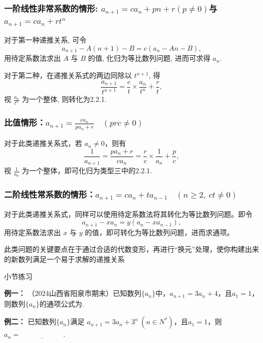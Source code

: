 \documentclass{article}
\begin{document}
\subsubsection{一阶线性非常系数的情形: $a_{n+1}=ca_n+pn+r(p\neq 0)$与$a_{n+1}=ca_n+rt^n$}

对于第一种递推关系, 可令
\[
a_{n+1} - A(n+1) - B = c(a_n - An - B),
\]
用待定系数法求出 \(A\) 与 \(B\) 的值, 化归为等比数列问题, 进而可求得 \(a_n\).


对于第二种，在递推关系式的两边同除以 \(t^{n+1}\), 得
\[
\frac{a_{n+1}}{t^{n+1}} = \frac{c}{t} \times \frac{a_n}{t^n} + \frac{r}{t},
\]
视 \(\frac{a_n}{t^n}\) 为一个整体, 则转化为2.2.1.

\subsubsection{比值情形：$a_{n+1} = \frac{ca_n}{pa_n + r} \quad (prc \neq 0)$}

对于此类递推关系式，若 \(a_n \neq 0\)，则有
\[
\frac{1}{a_{n+1}} = \frac{pa_n + r}{ca_n} = \frac{r}{c} \times \frac{1}{a_n} + \frac{p}{c},
\]
视 \(\frac{1}{a_n}\) 为一个整体，即可化归为类型三中的2.2.1.

\subsubsection{二阶线性常系数的情形：$a_{n+1} = ca_n + ta_{n-1} \quad (n \ge 2,\ ct \neq 0)$}

对于此类递推关系式，同样可以使用待定系数法将其转化为等比数列问题。即令
\[
a_{n+1} - xa_n = y(a_n - xa_{n-1}),
\]
用待定系数法求出 \(x\) 与 \(y\) 的值，即可转化为等比数列问题，进而求通项。

\newpage

\begin{tcolorbox}[colback=blue!10,colframe=blue!70!black,title=]
    此类问题的关键要点在于通过合适的代数变形，再进行“换元”处理，使你构建出来的新数列满足一个易于求解的递推关系
\end{tcolorbox}

\begin{center}
    小节练习
\end{center}

\noindent \textbf{例一： }（2024山西省阳泉市期末）已知数列$\{a_n\}$中，$a_{n+1}=3a_n+4$，且$a_1=1$，则数列$\{a_n\}$的通项公式为\underline{\quad\quad\quad\quad\quad\quad}.
\vspace{1\baselineskip}

\noindent \textbf{例二： }已知数列$\{a_n\}$满足 $a_{n+1}=3a_n+3^n\ (n\in N^*)$，且$a_1=1$，则$a_n=\underline{\quad\quad\quad\quad\quad\quad}.$
\vspace{1\baselineskip}
\end{document}
